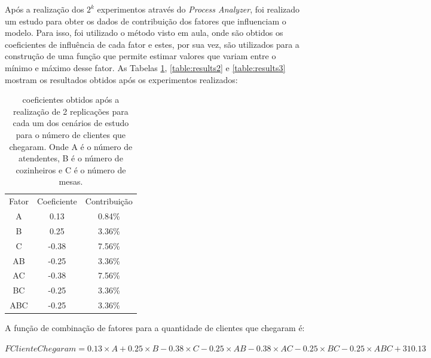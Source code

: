 \documentclass[pt,disc,oneside]{ufscpgeasthesis}
\begin{document}
			Após a realização dos $2^k$ experimentos através do \textit{Process Analyzer}, foi realizado um estudo para obter os dados de contribuição dos fatores que influenciam o modelo.
			Para isso, foi utilizado o método visto em aula, onde são obtidos os coeficientes de influência de cada fator e estes, por sua vez, são utilizados para a construção de uma função que permite estimar valores que variam entre o mínimo e máximo desse fator.
			As Tabelas \ref{table:results1}, \ref{table:results2} e \ref{table:results3} mostram os resultados obtidos após os experimentos realizados:

			\begin{table}[!ht]
				\centering
				\begin{tabular}{c|c|c}
					\rowcolor{gray!70} Fator 	& Coeficiente 	& Contribuição 	\\
					\rowcolor{gray!20} A 		& 0.13			& 0.84\%		\\
					\rowcolor{gray!40} B 		& 0.25			& 3.36\%		\\
					\rowcolor{gray!20} C 		& -0.38			& 7.56\%		\\
					\rowcolor{gray!40} AB 		& -0.25			& 3.36\%		\\
					\rowcolor{gray!20} AC 		& -0.38			& 7.56\%		\\
					\rowcolor{gray!40} BC 		& -0.25			& 3.36\%		\\
					\rowcolor{gray!20} ABC 		& -0.25			& 3.36\%		\\
				\end{tabular}
				\caption{coeficientes obtidos após a realização de 2 replicações para cada um dos cenários de estudo para o número de clientes que chegaram. Onde A é o número de atendentes, B é o número de cozinheiros e C é o número de mesas.}
				\label{table:results1}
			\end{table}

			A função de combinação de fatores para a quantidade de clientes que chegaram é:

			\begin{center}
				\large{$FClienteChegaram = 0.13 \times A + 0.25 \times B - 0.38 \times C - 0.25 \times AB - 0.38 \times AC - 0.25 \times BC - 0.25 \times ABC + 310.13$}
			\end{center}
\end{document}
